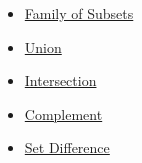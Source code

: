 \begin{dependencies}
\begin{itemize}
  \item \hyperref[def:family-of-subsets]{Family of Subsets}
  \item \hyperref[def:union]{Union}
  \item \hyperref[def:intersection]{Intersection}
  \item \hyperref[def:complement]{Complement}
  \item \hyperref[def:set-difference]{Set Difference}
\end{itemize}
\end{dependencies}
